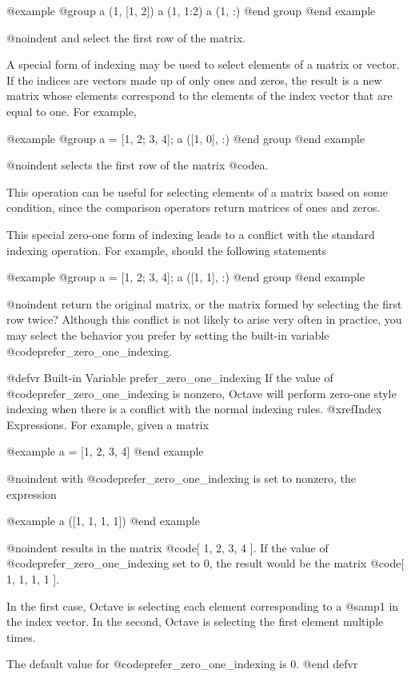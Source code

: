 @example
@group
a (1, [1, 2])
a (1, 1:2)
a (1, :)
@end group
@end example

@noindent
and select the first row of the matrix.

A special form of indexing may be used to select elements of a matrix or
vector.  If the indices are vectors made up of only ones and zeros, the
result is a new matrix whose elements correspond to the elements of the
index vector that are equal to one.  For example,

@example
@group
a = [1, 2; 3, 4];
a ([1, 0], :)
@end group
@end example

@noindent
selects the first row of the matrix @code{a}.

This operation can be useful for selecting elements of a matrix based on
some condition, since the comparison operators return matrices of ones
and zeros.

This special zero-one form of indexing leads to a conflict with the
standard indexing operation.  For example, should the following
statements

@example
@group
a = [1, 2; 3, 4];
a ([1, 1], :)
@end group
@end example

@noindent
return the original matrix, or the matrix formed by selecting the first
row twice?  Although this conflict is not likely to arise very often in
practice, you may select the behavior you prefer by setting the built-in
variable @code{prefer_zero_one_indexing}.

@defvr {Built-in Variable} prefer_zero_one_indexing
If the value of @code{prefer_zero_one_indexing} is nonzero, Octave
will perform zero-one style indexing when there is a conflict with the
normal indexing rules.  @xref{Index Expressions}.  For example, given a
matrix

@example
a = [1, 2, 3, 4]
@end example

@noindent
with @code{prefer_zero_one_indexing} is set to nonzero, the
expression

@example
a ([1, 1, 1, 1])
@end example

@noindent
results in the matrix @code{[ 1, 2, 3, 4 ]}.  If the value of
@code{prefer_zero_one_indexing} set to 0, the result would be
the matrix @code{[ 1, 1, 1, 1 ]}.

In the first case, Octave is selecting each element corresponding to a
@samp{1} in the index vector.  In the second, Octave is selecting the
first element multiple times.

The default value for @code{prefer_zero_one_indexing} is 0.
@end defvr

